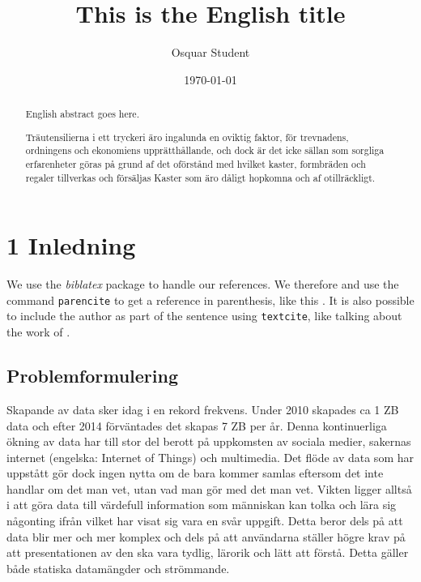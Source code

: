 \documentclass{kththesis}
\title{This is the English title}
\author{Osquar Student}
\date{\today}
\begin{document}
\frontmatter

\titlepage

\begin{abstract}
  English abstract goes here.

  \blindtext
\end{abstract}


\begin{otherlanguage}{swedish}
  \begin{abstract}
    Träutensilierna i ett tryckeri äro ingalunda en oviktig faktor,
    för trevnadens, ordningens och ekonomiens upprätthållande, och
    dock är det icke sällan som sorgliga erfarenheter göras på grund
    af det oförstånd med hvilket kaster, formbräden och regaler
    tillverkas och försäljas Kaster som äro dåligt hopkomna och af
    otillräckligt.
  \end{abstract}
\end{otherlanguage}


\tableofcontents


\mainmatter


\chapter{1 Inledning}


We use the \emph{biblatex} package to handle our references. We therefore and use the
command \texttt{parencite} to get a reference in parenthesis, like this
\parencite{heisenberg2015}.  It is also possible to include the author
as part of the sentence using \texttt{textcite}, like talking about
the work of \textcite{einstein2016}.

\section{Problemformulering}
Skapande av data sker idag i en rekord frekvens. Under 2010 skapades ca 1 ZB data och efter 2014 förväntades det skapas 7 ZB per år.\parencite{1} Denna kontinuerliga ökning av data har till stor del berott på uppkomsten av sociala medier, sakernas internet (engelska: Internet of Things) och multimedia.\parencite{2} Det flöde av data som har uppstått gör dock ingen nytta om de bara kommer samlas eftersom det inte handlar om det man vet, utan vad man gör med det man vet.\parencite{3} Vikten ligger alltså i att göra data till värdefull information som människan kan tolka och lära sig någonting ifrån vilket har visat sig vara en svår uppgift. Detta beror dels på att data blir mer och mer komplex och dels på att användarna ställer högre krav på att presentationen av den ska vara tydlig, lärorik och lätt att förstå. Detta gäller både statiska datamängder och strömmande.
\end{document}
